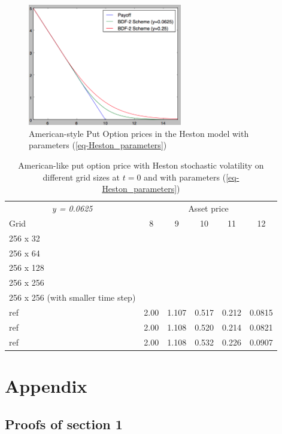 \documentclass[12pt,a4paper]{article}
\begin{document}
\begin{figure}
\center
\caption{American-style Put Option prices in the Heston model with parameters (\ref{eq-Heston_parameters})}
\includegraphics[width=0.6\textwidth]{img/Heston_price.png}
\end{figure}

\begin{table}
\centering
\begin{tabular}{l|ccccc}
\multicolumn{1}{c}{\textit{y = 0.0625}} &  \multicolumn{5}{c}{Asset price} \\
Grid & 8 & 9 & 10 & 11 & 12 \\
\hline
256 x 32 &  & & & & \\
256 x 64 & & & & & \\
256 x 128 & & & & & \\
256 x 256 & & & & & \\
256 x 256 (with smaller time step) & & & & & \\
\hline
ref \cite{Oosterlee} & 2.00 & 1.107 & 0.517 & 0.212 & 0.0815 \\
ref \cite{MR1628686} & 2.00 & 1.108 & 0.520 & 0.214 & 0.0821 \\
ref  \cite{ClarkeParrot} & 2.00 & 1.108 & 0.532 & 0.226 & 0.0907
\end{tabular}
\caption{American-like put option price with Heston stochastic volatility on different grid sizes at $t=0$ and with parameters (\ref{eq-Heston_parameters})}
\end{table}




\newpage
\section{Appendix}

	\subsection{Proofs of section 1}
	
\end{document}
